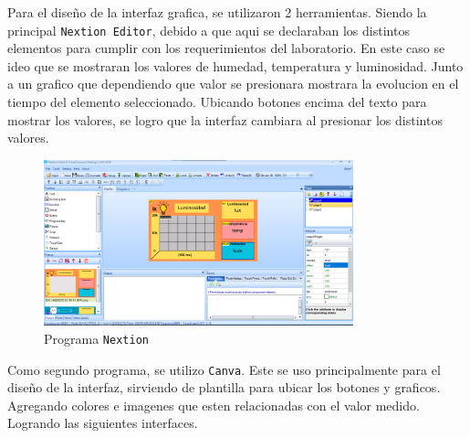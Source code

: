 Para el diseño de la interfaz grafica, se utilizaron 2 herramientas. Siendo la principal
\texttt{Nextion Editor}, debido a que aqui se declaraban los distintos elementos para 
cumplir con los requerimientos del laboratorio. En este caso se ideo que se mostraran 
los valores de humedad, temperatura y luminosidad. Junto a un grafico que dependiendo 
que valor se presionara mostrara la evolucion en el tiempo del elemento seleccionado.
Ubicando botones encima del texto para mostrar los valores, se logro que la interfaz 
cambiara al presionar los distintos valores.
\begin{figure}[h!]
    \centering
    \includegraphics[width=0.8\textwidth]{Diagramas/nextion.png}
    \caption{Programa \texttt{Nextion}}
    \label{fig:nextion}
\end{figure}

Como segundo programa, se utilizo \texttt{Canva}.
Este se uso principalmente para el diseño de la interfaz, sirviendo de plantilla para 
ubicar los botones y graficos. Agregando colores e imagenes que esten relacionadas 
con el valor medido. Logrando las siguientes interfaces.

